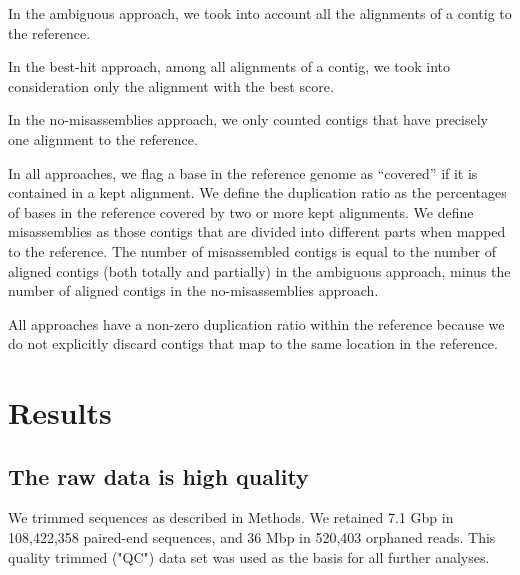 \documentclass[10pt,a4paper,twocolumn]{article}
\begin{document}



In the ambiguous approach, we took into account all the alignments of
a contig to the reference.

In the best-hit approach, among all alignments of a contig, we took
into consideration only the alignment with the best score.

In the no-misassemblies approach, we only counted contigs that have
precisely one alignment to the reference.

In all approaches, we flag a base in the reference genome as
``covered'' if it is contained in a kept alignment.  We define the
duplication ratio as the percentages of bases in the reference covered
by two or more kept alignments. We define misassemblies as
those contigs that are divided into different parts when mapped to the
reference.  The number of misassembled contigs is equal to the number
of aligned contigs (both totally and partially) in the ambiguous
approach, minus the number of aligned contigs in the no-misassemblies
approach.


All approaches have a non-zero duplication ratio within the reference
because we do not explicitly discard contigs that map to the same
location in the reference.

\section*{Results}

\subsection*{The raw data is high quality}

We trimmed sequences as described in Methods. We retained 7.1 Gbp in
108,422,358 paired-end sequences, and 36 Mbp in 520,403 orphaned
reads.  This quality trimmed ("QC") data set was used as the basis for
all further analyses.
\end{document}
